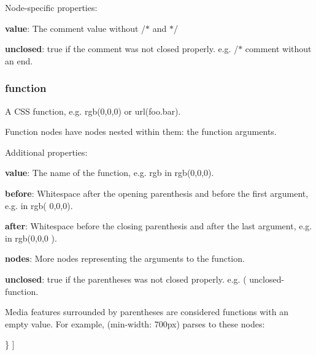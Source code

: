 {\ttfamily Node-\/specific properties\+:}

{\ttfamily 
\begin{DoxyItemize}
\item {\bfseries value}\+: The comment value without {\ttfamily /$\ast$} and {\ttfamily $\ast$/}
\item {\bfseries unclosed}\+: {\ttfamily true} if the comment was not closed properly. e.\+g. {\ttfamily /$\ast$ comment without an end}.
\end{DoxyItemize}}

{\ttfamily \subsubsection*{function}}

{\ttfamily }

{\ttfamily A C\+SS function, e.\+g. {\ttfamily rgb(0,0,0)} or {\ttfamily url(foo.\+bar)}.}

{\ttfamily Function nodes have nodes nested within them\+: the function arguments.}

{\ttfamily Additional properties\+:}

{\ttfamily 
\begin{DoxyItemize}
\item {\bfseries value}\+: The name of the function, e.\+g. {\ttfamily rgb} in {\ttfamily rgb(0,0,0)}.
\item {\bfseries before}\+: Whitespace after the opening parenthesis and before the first argument, e.\+g. in {\ttfamily rgb(  0,0,0)}.
\item {\bfseries after}\+: Whitespace before the closing parenthesis and after the last argument, e.\+g. in {\ttfamily rgb(0,0,0  )}.
\item {\bfseries nodes}\+: More nodes representing the arguments to the function.
\item {\bfseries unclosed}\+: {\ttfamily true} if the parentheses was not closed properly. e.\+g. {\ttfamily ( unclosed-\/function}.
\end{DoxyItemize}}

{\ttfamily Media features surrounded by parentheses are considered functions with an empty value. For example, {\ttfamily (min-\/width\+: 700px)} parses to these nodes\+:}

{\ttfamily 
\begin{DoxyCode}
[
  \{
    type: 'function', value: '', before: '', after: '',
    nodes: [
      \{ type: 'word', value: 'min-width' \},
      \{ type: 'div', value: ':', before: '', after: ' ' \},
      \{ type: 'word', value: '700px' \}
    ]
  \}
]
\end{DoxyCode}
}

